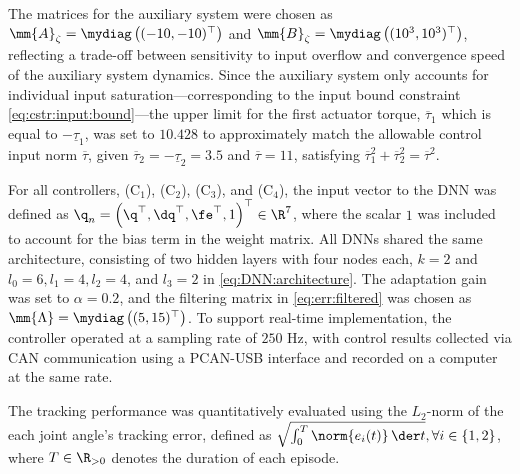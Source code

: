 \documentclass[journal]{IEEEtran}
\begin{document}
The matrices for the auxiliary system were chosen as $\mm{A}_\zeta=\mydiag\left((-10,-10)^\top\right)$ and $\mm{B}_\zeta=\mydiag\left((10^3,10^3)^\top\right)$, reflecting a trade-off between sensitivity to input overflow and convergence speed of the auxiliary system dynamics.
Since the auxiliary system only accounts for individual input saturation—corresponding to the input bound constraint \eqref{eq:cstr:input:bound}—the upper limit for the first actuator torque, $\overline{\tau}_1$ which is equal to $-\underline{\tau}_1$, was set to $10.428$ to approximately match the allowable control input norm $\overline{\tau}$, given $\overline{\tau}_2=-\underline{\tau}_2 = 3.5$ and $\overline{\tau} = 11$, satisfying $\overline{\tau}_1^2 + \overline{\tau}_2^2 = \overline{\tau}^2$.

\hfill

For all controllers, \ie (C$_1$), (C$_2$), (C$_3$), and (C$_4$), the input vector to the DNN was defined as ${\q}_n=\left(\q^\top,\dq^\top,\fe^\top,1\right)^\top\in\R^{7}$, where the scalar $1$ was included to account for the bias term in the weight matrix.
All DNNs shared the same architecture, consisting of two hidden layers with four nodes each, \ie $k=2$ and $l_0=6, l_1=4, l_2=4$, and $l_3=2$ in \eqref{eq:DNN:architecture}.
The adaptation gain was set to $\alpha = 0.2$, and the filtering matrix in \eqref{eq:err:filtered} was chosen as $\mm{\Lambda}=\mydiag\left((5,15)^\top\right)$.
To support real-time implementation, the controller operated at a sampling rate of $250$ Hz, with control results collected via CAN communication using a PCAN-USB interface and recorded on a computer at the same rate.

The tracking performance was quantitatively evaluated using the $L_2$-norm of the each joint angle's tracking error, defined as $\sqrt{\int_0^T\norm{e_i(t)}\,\der t},\forall i\in\{1,2\}$, where $T\in\R_{>0}$ denotes the duration of each episode.
\end{document}
